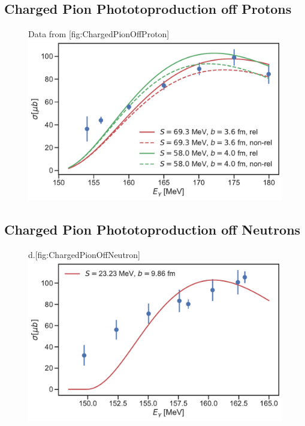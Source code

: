\subsection{Charged Pion Phototoproduction off Protons}
\begin{figure}[H]
	\begin{sidecaption}{Data from \cite{PionOffNeutron1}}[fig:ChargedPionOffProton]
		\includegraphics[width=\linewidth]{Figures/ChargedPionOffProtonExact.pdf}
	\end{sidecaption}
\end{figure}
\subsection{Charged Pion Phototoproduction off Neutrons}
\begin{figure}[H]
	\begin{sidecaption}{d.}[fig:ChargedPionOffNeutron]
		\includegraphics[width=\linewidth]{Figures/ChargedPionOffNeutron.pdf}
	\end{sidecaption}
\end{figure}